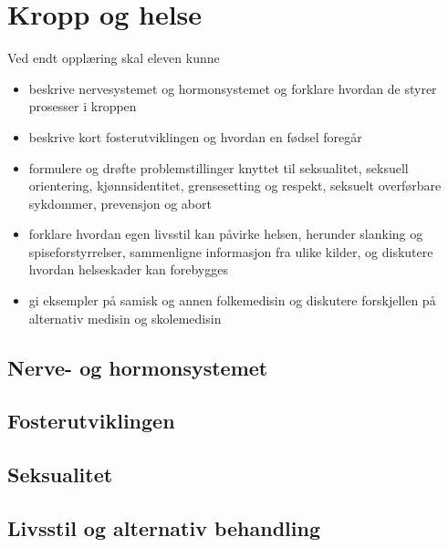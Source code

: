 \documentclass[main.tex]{subfiles}
\begin{document}
\section{Kropp og helse}
Ved endt opplæring skal eleven kunne
\begin{itemize}[noitemsep]
\item beskrive nervesystemet og hormonsystemet og forklare hvordan de styrer prosesser i kroppen
\item beskrive kort fosterutviklingen og hvordan en fødsel foregår
\item formulere og drøfte problemstillinger knyttet til seksualitet, seksuell orientering, kjønnsidentitet, grensesetting og respekt, seksuelt overførbare sykdommer, prevensjon og abort
\item forklare hvordan egen livsstil kan påvirke helsen, herunder slanking og spiseforstyrrelser, sammenligne informasjon fra ulike kilder, og diskutere hvordan helseskader kan forebygges
\item gi eksempler på samisk og annen folkemedisin og diskutere forskjellen på alternativ medisin og skolemedisin
\end{itemize} 

\subsection{Nerve- og hormonsystemet}

\subsection{Fosterutviklingen}

\subsection{Seksualitet}

\subsection{Livsstil og alternativ behandling}
\end{document}

